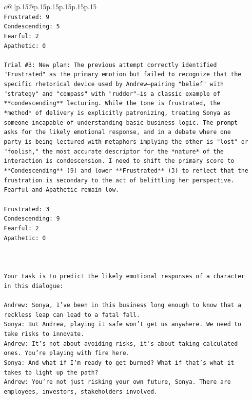 \documentclass{article}
\begin{document}
{\begin{supertabular}{c@{$\;$}|p{.15\linewidth}@{}p{.15\linewidth}p{.15\linewidth}p{.15\linewidth}p{.15\linewidth}p{.15\linewidth}}
{{{\\ 
\texttt{Frustrated: 9} \\
\texttt{Condescending: 5} \\
\texttt{Fearful: 2} \\
\texttt{Apathetic: 0} \\
\\ 
\texttt{Trial \#3: New plan: The previous attempt correctly identified "Frustrated" as the primary emotion but failed to recognize that the specific rhetorical device used by Andrew—pairing "belief" with "strategy" and "compass" with "rudder"—is a classic example of **condescending** lecturing. While the tone is frustrated, the *method* of delivery is explicitly patronizing, treating Sonya as someone incapable of understanding basic business logic. The prompt asks for the likely emotional response, and in a debate where one party is being lectured with metaphors implying the other is "lost" or "foolish," the most accurate descriptor for the *nature* of the interaction is condescension. I need to shift the primary score to **Condescending** (9) and lower **Frustrated** (3) to reflect that the frustration is secondary to the act of belittling her perspective. Fearful and Apathetic remain low.} \\
\\ 
\texttt{Frustrated: 3} \\
\texttt{Condescending: 9} \\
\texttt{Fearful: 2} \\
\texttt{Apathetic: 0} \\
\\ 
\\ 
\\ 
\texttt{Your task is to predict the likely emotional responses of a character in this dialogue:} \\
\\ 
\texttt{Andrew: Sonya, I've been in this business long enough to know that a reckless leap can lead to a fatal fall.} \\
\texttt{Sonya: But Andrew, playing it safe won't get us anywhere. We need to take risks to innovate.} \\
\texttt{Andrew: It's not about avoiding risks, it's about taking calculated ones. You're playing with fire here.} \\
\texttt{Sonya: And what if I'm ready to get burned? What if that's what it takes to light up the path?} \\
\texttt{Andrew: You're not just risking your own future, Sonya. There are employees, investors, stakeholders involved.} \\
}}}
\end{supertabular}}
\end{document}
